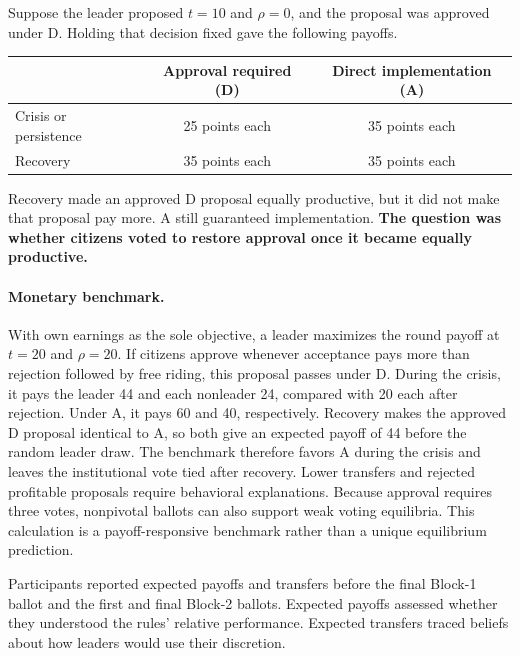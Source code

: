 \documentclass[11pt]{article}
\newcommand{\Dproc}{\textsf{D}}
\newcommand{\Aproc}{\textsf{A}}
\begin{document}
\begin{payoffbox}
Suppose the leader proposed $t=10$ and $\rho=0$, and the proposal was approved under \Dproc{}. Holding that decision fixed gave the following payoffs.

\begin{center}
\renewcommand{\arraystretch}{1.15}
\begin{tabular}{lcc}
\toprule
& Approval required (\Dproc) & Direct implementation (\Aproc) \\
\midrule
Crisis or persistence & 25 points each & 35 points each \\
Recovery & 35 points each & 35 points each \\
\bottomrule
\end{tabular}
\end{center}

Recovery made an approved \Dproc{} proposal equally productive, but it did not make that proposal pay more. \Aproc{} still guaranteed implementation. {\bf The question was whether citizens voted to restore approval once it became equally productive.}
\end{payoffbox}

\paragraph{Monetary benchmark.} With own earnings as the sole objective, a leader maximizes the round payoff at $t=20$ and $\rho=20$. If citizens approve whenever acceptance pays more than rejection followed by free riding, this proposal passes under \Dproc{}. During the crisis, it pays the leader 44 and each nonleader 24, compared with 20 each after rejection. Under \Aproc{}, it pays 60 and 40, respectively. Recovery makes the approved \Dproc{} proposal identical to \Aproc{}, so both give an expected payoff of 44 before the random leader draw. The benchmark therefore favors \Aproc{} during the crisis and leaves the institutional vote tied after recovery. Lower transfers and rejected profitable proposals require behavioral explanations. Because approval requires three votes, nonpivotal ballots can also support weak voting equilibria. This calculation is a payoff-responsive benchmark rather than a unique equilibrium prediction.

Participants reported expected payoffs and transfers before the final Block-1 ballot and the first and final Block-2 ballots. Expected payoffs assessed whether they understood the rules' relative performance. Expected transfers traced beliefs about how leaders would use their discretion.
\end{document}
